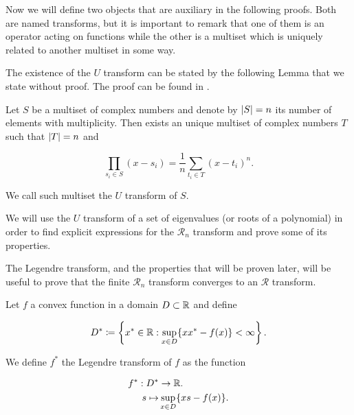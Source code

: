 Now we will define two objects that are auxiliary in the following proofs. Both are named transforms, but it is important to remark that one of them is an operator acting on functions while the other is a multiset which is uniquely related to another multiset in some way.

The existence of the $U$ transform can be stated by the following Lemma that we state without proof. The proof can be found in \cite{anaya2016cumulantes}.

\begin{lemma}[$U$ transform]
    Let $S$ be a multiset of complex numbers and denote by $\lvert S \rvert=n$ its number of elements with multiplicity. Then exists an unique multiset of complex numbers $T$ such that $\lvert T \rvert=n$ and 

    \begin{equation*}
        \prod_{s_i \in S} (x-s_i) = \frac 1n \sum_{t_i \in T} (x-t_i)^n.
    \end{equation*}

    We call such multiset the $U$ transform of $S$.
\end{lemma}

We will use the $U$ transform of a set of eigenvalues (or roots of a polynomial) in order to find explicit expressions for the $\mathcal R_n$ transform and prove some of its properties. 

The Legendre transform, and the properties that will be proven later, will be useful to prove that the finite $\mathcal R_n$ transform converges to an $\mathcal R$ transform.

\begin{definition}
    Let $f$ a convex function in a domain $D\subset \mathbb R$ and define

    \begin{equation} \label{eq:legendre_set}
        D^* \coloneqq \left\{ x^* \in \mathbb R \mathrel{:} \sup_{x \in D} \{xx^* - f(x)\} < \infty \right\}.
    \end{equation}

    We define $f^*$ the Legendre transform of $f$ as the function

    \begin{align*}
        f^* : D^* &\to \mathbb R.\\
        s \mapsto &\sup_{x \in D} \{ xs - f(x) \}.
    \end{align*}
\end{definition}

